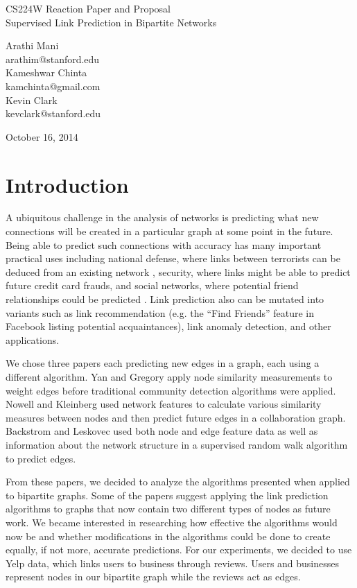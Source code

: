 \documentclass[11pt]{article}
\begin{document}
\begin{center}
{\LARGE{CS224W Reaction Paper and Proposal}} \\
{\LARGE{Supervised Link Prediction in Bipartite Networks}} \\
{\large \begin{multicols}{3}
Arathi Mani\\
arathim@stanford.edu\\
\columnbreak
Kameshwar Chinta\\
kamchinta@gmail.com\\
\columnbreak
Kevin Clark\\
kevclark@stanford.edu\\
\end{multicols}
October 16, 2014}
\end{center}


\section{Introduction}
A ubiquitous challenge in the analysis of networks is predicting what new connections will be created in a particular graph at some point in the future.  Being able to predict such connections with accuracy has many important practical uses including national defense, where links between terrorists can be deduced from an existing network \cite{krebs}, security, where links might be able to predict future credit card frauds, and social networks, where potential friend relationships could be predicted \cite{backstromjure}.  Link prediction also can be mutated into variants such as link recommendation (e.g. the ``Find Friends'' feature in Facebook listing potential acquaintances), link anomaly detection, and other applications.\\
\par
We chose three papers each predicting new edges in a graph, each using a different algorithm.  Yan and Gregory \cite{yangregory} apply node similarity measurements to weight edges before traditional community detection algorithms were applied.  Nowell and Kleinberg \cite{nowellklein} used network features to calculate various similarity measures between nodes and then predict future edges in a collaboration graph.  Backstrom and Leskovec \cite{backstromjure} used both node and edge feature data as well as information about the network structure in a supervised random walk algorithm to predict edges.\\
\par
From these papers, we decided to analyze the algorithms presented when applied to bipartite graphs.  Some of the papers suggest applying the link prediction algorithms to graphs that now contain two different types of nodes as future work.  We became interested in researching how effective the algorithms would now be and whether modifications in the algorithms could be done to create equally, if not more, accurate predictions.  For our experiments, we decided to use Yelp data, which links users to business through reviews.  Users and businesses represent nodes in our bipartite graph while the reviews act as edges.
\end{document}
